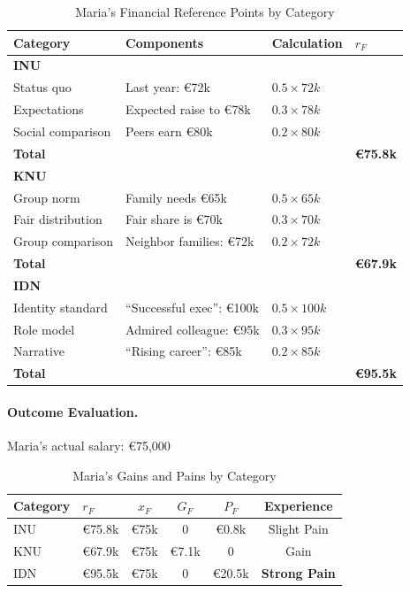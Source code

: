 \begin{table}[htbp]
\centering
\caption{Maria's Financial Reference Points by Category}
\label{tab:maria-reference}
\renewcommand{\arraystretch}{1.4}
\begin{tabular}{@{}llll@{}}
\toprule
\textbf{Category} & \textbf{Components} & \textbf{Calculation} & $r_F$ \\
\midrule
\textbf{INU} & & & \\
\quad Status quo & Last year: \euro{72k} & $0.5 \times 72k$ & \\
\quad Expectations & Expected raise to \euro{78k} & $0.3 \times 78k$ & \\
\quad Social comparison & Peers earn \euro{80k} & $0.2 \times 80k$ & \\
\quad \textbf{Total} & & & \textbf{\euro{75.8k}} \\
\midrule
\textbf{KNU} & & & \\
\quad Group norm & Family needs \euro{65k} & $0.5 \times 65k$ & \\
\quad Fair distribution & Fair share is \euro{70k} & $0.3 \times 70k$ & \\
\quad Group comparison & Neighbor families: \euro{72k} & $0.2 \times 72k$ & \\
\quad \textbf{Total} & & & \textbf{\euro{67.9k}} \\
\midrule
\textbf{IDN} & & & \\
\quad Identity standard & ``Successful exec'': \euro{100k} & $0.5 \times 100k$ & \\
\quad Role model & Admired colleague: \euro{95k} & $0.3 \times 95k$ & \\
\quad Narrative & ``Rising career'': \euro{85k} & $0.2 \times 85k$ & \\
\quad \textbf{Total} & & & \textbf{\euro{95.5k}} \\
\bottomrule
\end{tabular}
\end{table}

\paragraph{Outcome Evaluation.}
Maria's actual salary: \euro{75,000}

\begin{table}[htbp]
\centering
\caption{Maria's Gains and Pains by Category}
\label{tab:maria-gains-pains}
\renewcommand{\arraystretch}{1.3}
\begin{tabular}{@{}llcccc@{}}
\toprule
\textbf{Category} & $r_F$ & $x_F$ & $G_F$ & $P_F$ & \textbf{Experience} \\
\midrule
INU & \euro{75.8k} & \euro{75k} & 0 & \euro{0.8k} & Slight Pain \\
KNU & \euro{67.9k} & \euro{75k} & \euro{7.1k} & 0 & Gain \\
IDN & \euro{95.5k} & \euro{75k} & 0 & \euro{20.5k} & \textbf{Strong Pain} \\
\bottomrule
\end{tabular}
\end{table}

